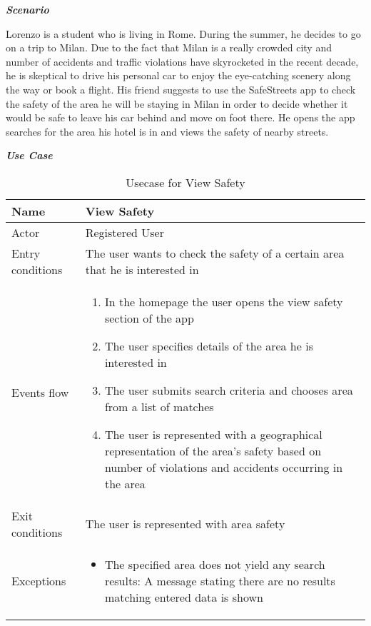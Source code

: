 \emph{\textbf{Scenario}}

Lorenzo is a student who is living in Rome. During the summer, he decides to go on a trip to Milan. Due to the fact that Milan is a really crowded city and number of accidents and traffic violations have skyrocketed in the recent decade, he is skeptical to drive his personal car to enjoy the eye-catching scenery along the way or book a flight. His friend suggests to use the SafeStreets app to check the safety of the area he will be staying in Milan in order to decide whether it would be safe to leave his car behind and move on foot there. He opens the app searches for the area his hotel is in and views the safety of nearby streets.


\begin{table}[H]
\begin{flushleft}\emph{\textbf{Use Case}}\end{flushleft}
\footnotesize
\centering
\settowidth{}
\setlength\extrarowheight{2pt}
\begin{tabulary}{\textwidth}{|J|J|}
\hline
Name  & View Safety \\
\hline
Actor & Registered User \\
\hline
Entry conditions & The user wants to check the safety of a certain area that he is interested in \\
\hline
Events flow & 
\begin{minipage}[t]{0.7\textwidth}
\begin{enumerate} 
\item In the homepage the user opens the view safety section of the app
\item The user specifies details of the area he is interested in
\item The user submits search criteria and chooses area from a list of matches
\item The user is represented with a geographical representation of the area’s safety based on number of violations and accidents occurring in the area
\end{enumerate}
\end{minipage}\\
\hline
Exit conditions  & The user is represented with area safety\\
\hline
Exceptions       & 
\begin{minipage}[t]{0.8\textwidth}
\begin{itemize} 
\item The specified area does not yield any search results: A message stating there are no results matching entered data is shown
\end{itemize}
\end{minipage}\\
\hline
\end{tabulary}
\caption{\label{tab:Usecase-View-Safety}Usecase for View Safety}
\end{table}

